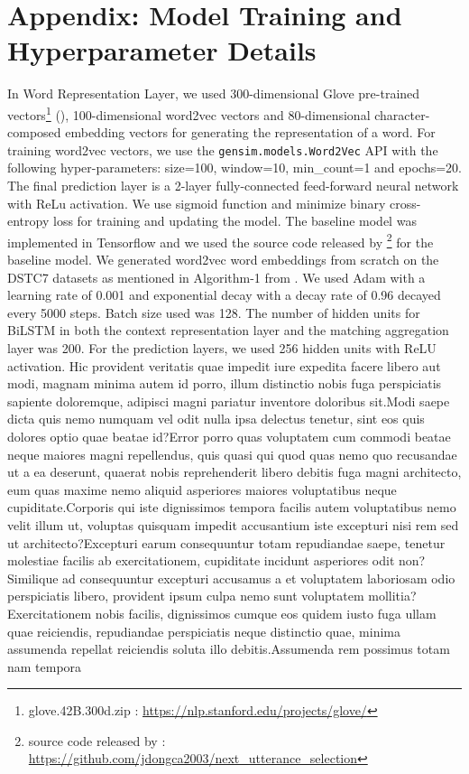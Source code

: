 \documentclass[letterpaper]{article} %
\begin{document}
\vspace{-1.01mm}
\section{Appendix: Model Training and Hyperparameter Details}
In Word Representation Layer, we used 300-dimensional Glove pre-trained vectors\footnote{glove.42B.300d.zip : \url{https://nlp.stanford.edu/projects/glove/}} (\cite{pennington2014glove}), 100-dimensional word2vec vectors \cite{mikolov2013efficient} and 80-dimensional character-composed embedding vectors for generating the representation of a word. For training word2vec vectors, we use the \texttt{gensim.models.Word2Vec} API with the following hyper-parameters: size=100, window=10, min\_count=1 and epochs=20. The final prediction layer is a 2-layer fully-connected feed-forward neural network with ReLu activation. We use sigmoid function and minimize binary cross-entropy loss for training and updating the model.  The baseline model was implemented in Tensorflow \cite{abadi2016tensorflow} and we used the source code released by \citeauthor{dong2018enhance} \footnote{source code released by \citeauthor{dong2018enhance} : \url{https://github.com/jdongca2003/next_utterance_selection}} for the baseline model. We generated word2vec word embeddings from scratch on the DSTC7 datasets as mentioned in Algorithm-1 from \citeauthor{dong2018enhance} . We used Adam \cite{kingma2014adam} with a learning rate of 0.001 and exponential decay with a decay rate of 0.96 decayed every 5000 steps. Batch size used was 128. The number of hidden units for BiLSTM in both the context representation layer and the matching aggregation layer was 200. For the prediction layers, we used 256 hidden units with ReLU activation.  Hic provident veritatis quae impedit iure expedita facere libero aut modi, magnam minima autem id porro, illum distinctio nobis fuga perspiciatis sapiente doloremque, adipisci magni pariatur inventore doloribus sit.Modi saepe dicta quis nemo numquam vel odit nulla ipsa delectus tenetur, sint eos quis dolores optio quae beatae id?Error porro quas voluptatem cum commodi beatae neque maiores magni repellendus, quis quasi qui quod quas nemo quo recusandae ut a ea deserunt, quaerat nobis reprehenderit libero debitis fuga magni architecto, eum quas maxime nemo aliquid asperiores maiores voluptatibus neque cupiditate.Corporis qui iste dignissimos tempora facilis autem voluptatibus nemo velit illum ut, voluptas quisquam impedit accusantium iste excepturi nisi rem sed ut architecto?Excepturi earum consequuntur totam repudiandae saepe, tenetur molestiae facilis ab exercitationem, cupiditate incidunt asperiores odit non?Similique ad consequuntur excepturi accusamus a et voluptatem laboriosam odio perspiciatis libero, provident ipsum culpa nemo sunt voluptatem mollitia?Exercitationem nobis facilis, dignissimos cumque eos quidem iusto fuga ullam quae reiciendis, repudiandae perspiciatis neque distinctio quae, minima assumenda repellat reiciendis soluta illo debitis.Assumenda rem possimus totam nam tempora


\end{document}
